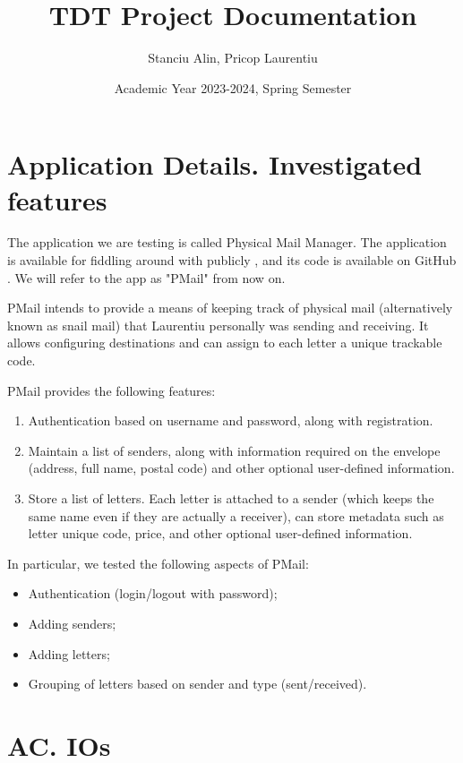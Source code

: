 \documentclass{article}
\title{TDT Project Documentation}
\author{Stanciu Alin, Pricop Laurentiu}
\date{Academic Year 2023-2024, Spring Semester}
\begin{document}

\maketitle
\tableofcontents

\newpage
{}

\section{Application Details. Investigated features}

The application we are testing is called Physical Mail Manager. The application is available for fiddling around with publicly \cite{PmailSite}, and its code is available on GitHub \cite{PmailGithub}. We will refer to the app as "PMail" from now on.

PMail intends to provide a means of keeping track of physical mail (alternatively known as snail mail) that Laurentiu personally was sending and receiving. It allows configuring destinations and can assign to each letter a unique trackable code.

PMail provides the following features:
\begin{enumerate}
    \item Authentication based on username and password, along with registration.
    \item Maintain a list of senders, along with information required on the envelope (address, full name, postal code) and other optional user-defined information.
    \item Store a list of letters. Each letter is attached to a sender (which keeps the same name even if they are actually a receiver), can store metadata such as letter unique code, price, and other optional user-defined information.
\end{enumerate}

In particular, we tested the following aspects of PMail:
\begin{itemize}
    \item Authentication (login/logout with password);
    \item Adding senders;
    \item Adding letters;
    \item Grouping of letters based on sender and type (sent/received).
\end{itemize}

\section{AC. IOs}
\end{document}
